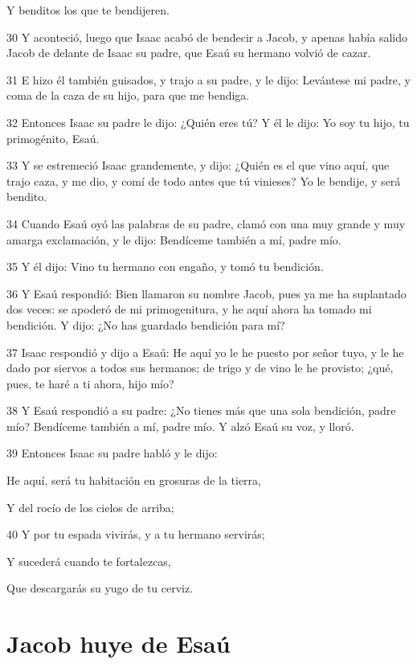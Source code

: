 \par Y benditos los que te bendijeren.
\par 30 Y aconteció, luego que Isaac acabó de bendecir a Jacob, y apenas había salido Jacob de delante de Isaac su padre, que Esaú su hermano volvió de cazar.
\par 31 E hizo él también guisados, y trajo a su padre, y le dijo: Levántese mi padre, y coma de la caza de su hijo, para que me bendiga.
\par 32 Entonces Isaac su padre le dijo: ¿Quién eres tú? Y él le dijo: Yo soy tu hijo, tu primogénito, Esaú.
\par 33 Y se estremeció Isaac grandemente, y dijo: ¿Quién es el que vino aquí, que trajo caza, y me dio, y comí de todo antes que tú vinieses? Yo le bendije, y será bendito.
\par 34 Cuando Esaú oyó las palabras de su padre, clamó con una muy grande y muy amarga exclamación, y le dijo: Bendíceme también a mí, padre mío.
\par 35 Y él dijo: Vino tu hermano con engaño, y tomó tu bendición.
\par 36 Y Esaú respondió: Bien llamaron su nombre Jacob, pues ya me ha suplantado dos veces: se apoderó de mi primogenitura, y he aquí ahora ha tomado mi bendición. Y dijo: ¿No has guardado bendición para mí?
\par 37 Isaac respondió y dijo a Esaú: He aquí yo le he puesto por señor tuyo, y le he dado por siervos a todos sus hermanos; de trigo y de vino le he provisto; ¿qué, pues, te haré a ti ahora, hijo mío?
\par 38 Y Esaú respondió a su padre: ¿No tienes más que una sola bendición, padre mío? Bendíceme también a mí, padre mío. Y alzó Esaú su voz, y lloró.
\par 39 Entonces Isaac su padre habló y le dijo:
\par He aquí, será tu habitación en grosuras de la tierra,
\par Y del rocío de los cielos de arriba;
\par 40 Y por tu espada vivirás, y a tu hermano servirás;
\par Y sucederá cuando te fortalezcas,
\par Que descargarás su yugo de tu cerviz.

\section*{Jacob huye de Esaú}

